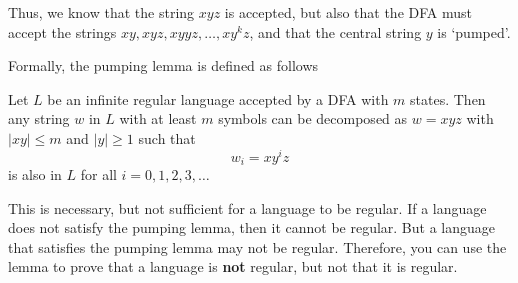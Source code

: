 Thus, we know that the string $xyz$ is accepted, but also that the DFA must accept the strings
 $xy, xyz, xyyz, \ldots, x{y^k}z$, and that the central string $y$ is `pumped'.

Formally, the pumping lemma is defined as follows
\begin{definition*}{}{}
  Let $L$ be an infinite regular language accepted by a DFA with $m$ states. Then any string $w$ in $L$ with at least $m$
   symbols can be decomposed as $w = xyz$ with $|xy| \leq m$ and $|y| \geq 1$ such that
  \begin{equation*}
    w_i = x{y^i}z
  \end{equation*}
  is also in $L$ for all $i = 0, 1, 2, 3, \ldots$
\end{definition*}

This is necessary, but not sufficient for a language to be regular. If a language does not satisfy the pumping lemma,
 then it cannot be regular. But a language that satisfies the pumping lemma may not be regular. Therefore, you can use
 the lemma to prove that a language is \textbf{not} regular, but not that it is regular.